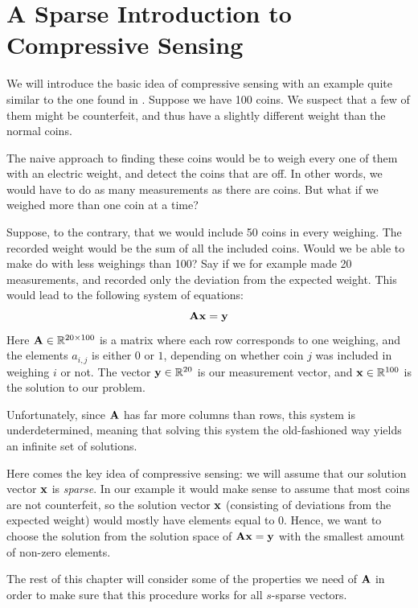 \chapter{A Sparse Introduction to Compressive Sensing}
\label{sec:basic_cs}

We will introduce the basic idea of compressive sensing with an example quite similar to the one found in \cite{bryan13makingdo}. Suppose we have 100 coins. We suspect that a few of them might be counterfeit, and thus have a slightly different weight than the normal coins. 

The naive approach to finding these coins would be to weigh every one of them with an electric weight, and detect the coins that are off. In other words, we would have to do as many measurements as there are coins. But what if we weighed more than one coin at a time?

Suppose, to the contrary, that we would include 50 coins in every weighing. The recorded weight would be the sum of all the included coins. Would we be able to make do with less weighings than 100? Say if we for example made 20 measurements, and recorded only the deviation from the expected weight. This would lead to the following system of equations:
\[
	\mathbf{A}\mathbf{x} = \mathbf{y}
\]
Here $ \mathbf{A} \in \mathbb{R}^{20 \times 100} $ is a matrix where each row corresponds to one weighing, and the elements $ a_{i,j} $ is either $ 0 $ or $ 1 $, depending on whether coin $ j $ was included in weighing $ i $ or not. The vector $ \mathbf{y} \in \mathbb{R}^{20} $ is our measurement vector, and $ \mathbf{x} \in \mathbb{R}^{100} $ is the solution to our problem. 

Unfortunately, since $ \mathbf{A} $ has far more columns than rows, this system is underdetermined, meaning that solving this system the old-fashioned way yields an infinite set of solutions. 

Here comes the key idea of compressive sensing: we will assume that our solution vector $ \mathbf{x} $ is \textit{sparse}. In our example it would make sense to assume that most coins are not counterfeit, so the solution vector $ \mathbf{x} $ (consisting of deviations from the expected weight) would mostly have elements equal to $ 0 $. Hence, we want to choose the solution from the solution space of $ \mathbf{A}\mathbf{x} = \mathbf{y} $ with the smallest amount of non-zero elements.

The rest of this chapter will consider some of the properties we need of $ \mathbf{A} $ in order to make sure that this procedure works for all $ s $-sparse vectors. 








